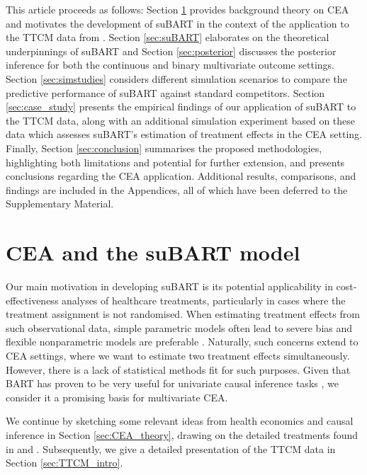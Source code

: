 \documentclass[aoas,preprint]{imsart}
\theoremstyle{plain}
\theoremstyle{definition}
\theoremstyle{remark}
\begin{document}
This article proceeds as follows: Section \ref{sec:application} provides background theory on CEA and motivates the development of suBART in the context of the application to the TTCM data from \citet{wiertsema2019cost}. Section \ref{sec:suBART}  elaborates on the theoretical underpinnings of suBART and Section \ref{sec:posterior} discusses the posterior inference for both the continuous and  binary multivariate outcome settings. Section \ref{sec:simstudies} considers different simulation scenarios to compare the predictive performance of suBART against standard competitors. Section \ref{sec:case_study} presents the empirical findings of our application of suBART to the TTCM data, along with an additional simulation experiment based on these data which assesses suBART's estimation of treatment effects in the CEA setting. Finally, Section \ref{sec:conclusion} summarises the proposed methodologies, highlighting both 
limitations and potential for further extension, and presents conclusions regarding the CEA application. Additional results, comparisons, and findings are included in the Appendices, all of which have been deferred to the Supplementary Material.

\section{CEA and the suBART model}\label{sec:application}

Our main motivation in developing suBART is its potential applicability in cost-effectiveness analyses of healthcare treatments, particularly in cases where the treatment assignment is not randomised. When estimating treatment effects from such observational data, simple parametric models often lead to severe bias and flexible nonparametric models are preferable \citep{hernan2024causal}. 
Naturally, such concerns extend to CEA settings, where we want to estimate two treatment effects simultaneously. However, there is a lack of statistical methods fit for such purposes. Given that BART has proven to be very useful for univariate causal inference tasks \citep{hill2011bayesian,dorie2019automated,rudolph2023all}, we consider it a promising basis for multivariate CEA.

We continue by sketching some relevant ideas from health economics and causal inference in Section \ref{sec:CEA_theory}, drawing on the detailed treatments found in \citet{gabrio2019bayesian} and \citet{li2023bayesian}. Subsequently, we give a detailed presentation of the TTCM data in Section \ref{sec:TTCM_intro}.
\end{document}

